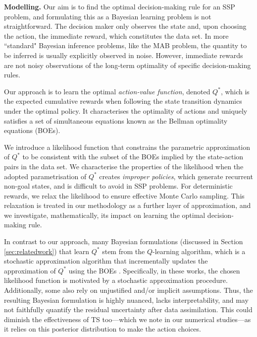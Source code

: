 \documentclass{amsart}
\begin{document}
\textbf{Modelling.} Our aim is to find the optimal decision-making rule for an SSP problem, and formulating this as a Bayesian learning problem is not straightforward. The decision maker only observes the state and, upon choosing the action, the immediate reward, which constitutes the data set. In more ``standard" Bayesian inference problems, like the MAB problem, the quantity to be inferred is usually explicitly observed in noise. However, immediate rewards are not noisy observations of the long-term optimality of specific decision-making rules.

Our approach is to learn the optimal \emph{action-value function}, denoted $Q^*$, which is the expected cumulative rewards when following the state transition dynamics under the optimal policy. It characterises the optimality of actions and uniquely satisfies a set of simultaneous equations known as the Bellman optimality equations (BOEs). 

We introduce a likelihood function that constrains the parametric approximation of $Q^*$ to be consistent with the subset of the BOEs implied by the state-action pairs in the data set. We characterise the properties of the likelihood when the adopted parametrisation of $Q^*$ creates \textit{improper policies}, which generate recurrent non-goal states, and is difficult to avoid in SSP problems. For deterministic rewards, we relax the likelihood to ensure effective Monte Carlo sampling. This relaxation is treated in our methodology as a further layer of approximation, and we investigate, mathematically, its impact on learning the optimal decision-making rule.

In contrast to our approach, many Bayesian formulations (discussed in Section \ref{sec:relatedwork}) that learn $Q^*$ stem from the $Q$-learning algorithm, which is a stochastic approximation algorithm \citep{bertsekas2019} that incrementally updates the approximation of $Q^*$ using the BOEs \citep{qlearning1992}. Specifically, in these works, the chosen likelihood function is motivated by a stochastic approximation procedure. Additionally, some also rely on unjustified and/or implicit assumptions. Thus, the resulting Bayesian formulation is highly nuanced, lacks interpretability, and may not faithfully quantify the residual uncertainty after data assimilation. This could diminish the effectiveness of TS too---which we note in our numerical studies---as it relies on this posterior distribution to make the action choices. 
\end{document}
